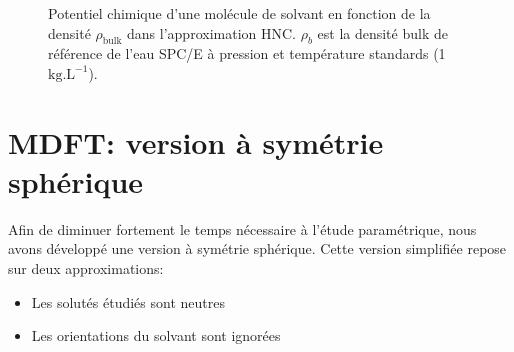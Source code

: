 


\begin{figure}[ht]
    \center
    \caption[Potentiel chimique d'une molécule de solvant en fonction de sa densité.]{Potentiel chimique d'une molécule de solvant en fonction de la densité $\rho_{\mathrm{bulk}}$ dans l'approximation HNC. $\rho_b$ est la densité bulk de référence de l'eau SPC/E à pression et température standards (1 $\mathrm{kg.L}^{-1}$).}
    \label{fig:fonctionelle_HNC}
\end{figure}





\section{MDFT: version à symétrie sphérique}
Afin de diminuer fortement le temps nécessaire à l'étude paramétrique, nous avons développé une version à symétrie sphérique. Cette version simplifiée repose sur deux approximations:
\begin{itemize}
\item Les solutés étudiés sont neutres
\item Les orientations du solvant sont ignorées
\end{itemize}

